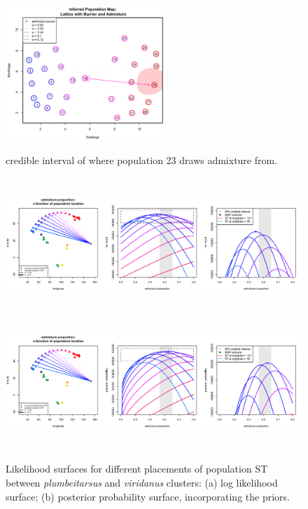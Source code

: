 \documentclass[12pt]{article}
\begin{document}
\begin{figure}[ht!]
	\centering
		{\includegraphics[width=2.4in,height=2in]{figs/sims/GeoGenMap_barr_inland_admixture_2.png}}
	\caption{credible interval of where population 23 draws admixture from.}
\label{sfig:barr_inland_ad_credset}
\end{figure}

\begin{figure}
	\centering
			{\includegraphics[width=6in,height=2in]{figs/warblers/admix_prop_func_loc_lnl.png}}
			{\includegraphics[width=6in,height=2in]{figs/warblers/admix_prop_func_loc_prob.png}}
	\caption{Likelihood surfaces for different placements of population ST between \textit{plumbeitarsus} and \textit{viridanus} clusters: (a) log likelihood surface; (b) posterior probability surface, incorporating the priors.}\label{sfig:admix_prop_func_loc}
\end{figure}
\end{document}
